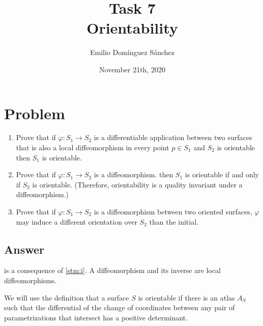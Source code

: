 \documentclass[
    12pt, %
]{fphw}
\title{Task 7 \\ Orientability} %
\author{Emilio Domínguez Sánchez} %
\date{November 21th, 2020} %
\institute{University of Murcia \\ Faculty of Mathematics} %
\begin{document}
\maketitle %


\section*{Problem}

\begin{problem}
    \begin{enumerate}
        \item \label{stm:i} Prove that if $φ : S_1 \to S_2$ is
        a differentiable application between two surfaces that is also
        a local diffeomorphism in every point $p \in S_1$ and
        $S_2$ is orientable then
        $S_1$ is orientable.

        \item \label{stm:ii} Prove that if $φ : S_1 \to S_2$ is a diffeomorphism.
        then $S_1$ is orientable if and only if $S_2$ is orientable.
        (Therefore, orientability is a quality invariant under a diffeomorphism.)

        \item \label{stm:iii} Prove that if $φ : S_1 \to S_2$ is a diffeomorphism between
        two oriented surfaces,
        $φ$ may induce a different orientation over $S_2$ than the initial.
    \end{enumerate}
\end{problem}


\subsection*{Answer}

     is a consequence of \cref{stm:i}.
A diffeomorphism and its inverse are local diffeomorphisms.

    We will use the definition that
a surface $S$ is orientable if there is an atlas $A_S$ such that the
differential of the change of coordinates
between any pair of parametrizations that intersect
has a positive determinant.
\end{document}
